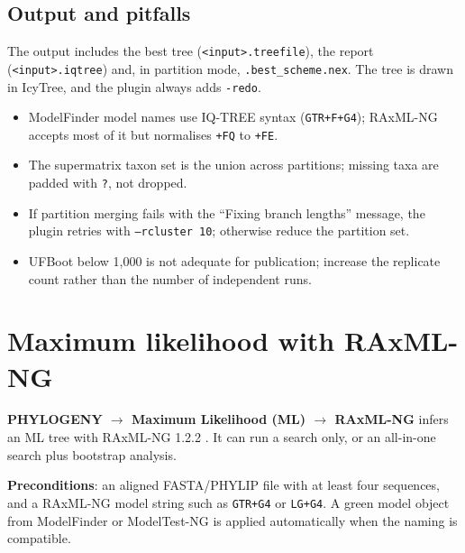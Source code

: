\documentclass[10pt]{report}
\begin{document}
\subsection{Output and pitfalls}

The output includes the best tree (\texttt{<input>.treefile}), the report
(\texttt{<input>.iqtree}) and, in partition mode,
\texttt{.best\_scheme.nex}. The tree is drawn in IcyTree, and the plugin always
adds \texttt{-redo}.

\begin{itemize}
  \item ModelFinder model names use IQ-TREE syntax (\texttt{GTR+F+G4});
        RAxML-NG accepts most of it but normalises \texttt{+FQ} to
        \texttt{+FE}.
  \item The supermatrix taxon set is the union across partitions; missing taxa
        are padded with \texttt{?}, not dropped.
  \item If partition merging fails with the ``Fixing branch lengths'' message,
        the plugin retries with \texttt{--rcluster 10}; otherwise reduce the
        partition set.
  \item UFBoot below 1{,}000 is not adequate for publication; increase the
        replicate count rather than the number of independent runs.
\end{itemize}

\section{Maximum likelihood with RAxML-NG}

\textbf{PHYLOGENY $\rightarrow$ Maximum Likelihood (ML) $\rightarrow$ RAxML-NG}
infers an ML tree with RAxML-NG 1.2.2 \cite{raxmlng}. It can run a search only, or an
all-in-one search plus bootstrap analysis.

\textbf{Preconditions}: an aligned FASTA/PHYLIP file with at least four
sequences, and a RAxML-NG model string such as \texttt{GTR+G4} or
\texttt{LG+G4}. A green model object from ModelFinder or ModelTest-NG is applied
automatically when the naming is compatible.
\end{document}
